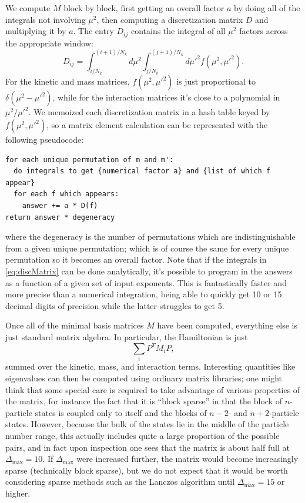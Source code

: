\begin{subappendices}
We compute $M$ block by block, first getting an overall factor $a$ by doing all 
of the integrals not involving $\mu^2$, then computing a discretization matrix 
$D$ and multiplying it by $a$. The entry $D_{ij}$ contains the integral of all
$\mu^2$ factors across the appropriate window:
\begin{equation}
    D_{ij} = \int_{i/N_k}^{(i+1)/N_k} d\mu^2 \int_{j/N_k}^{(j+1)/N_k} d\mu'^2
             f(\mu^2, \mu'^2).
    \label{eq:discMatrix}
\end{equation}
For the kinetic and mass matrices, $f(\mu^2, \mu'^2)$ is just proportional to
$\delta(\mu^2 - \mu'^2)$, while for the interaction matrices it's close to a 
polynomial in $\mu^2/\mu'^2$. We memoized each discretization matrix in a hash
table keyed by $f(\mu^2, \mu'^2)$, so a matrix element calculation can be 
represented with the following pseudocode:
\begin{verbatim}
for each unique permutation of m and m':
  do integrals to get {numerical factor a} and {list of which f appear}
  for each f which appears:
    answer += a * D(f)
return answer * degeneracy
\end{verbatim}
where the degeneracy is the number of permutations which are indistinguishable
from a given unique permutation; which is of course the same for every unique 
permutation so it becomes an overall factor. Note that if the integrals in 
\eqref{eq:discMatrix} can be done analytically, it's possible to program in the
answers as a function of a given set of input exponents. This is fantastically
faster and more precise than a numerical integration, being able to quickly get
10 or 15 decimal digits of precision while the latter struggles to get 5.

Once all of the minimal basis matrices $M$ have been computed, everything else
is just standard matrix algebra. In particular, the Hamiltonian is just
\begin{equation}
    \sum_i P^T M_i P,
\end{equation}
summed over the kinetic, mass, and interaction terms. Interesting quantities
like eigenvalues can then be computed using ordinary matrix libraries; one might
think that some special care is required to take advantage of various properties
of the matrix, for instance the fact that it is ``block sparse'' in that the
block of $n$-particle states is coupled only to itself and the blocks of $n-2$-
and $n+2$-particle states. However, because the bulk of the states lie in the
middle of the particle number range, this actually includes quite a large 
proportion of the possible pairs, and in fact upon inspection one sees that the
matrix is about half full at $\Delta_\mathrm{max} = 10$. If 
$\Delta_\mathrm{max}$ were increased further, the matrix would become 
increasingly sparse (technically block sparse), but we do not expect that it 
would be worth considering sparse methods such as the Lanczos algorithm until 
$\Delta_\mathrm{max} = 15$ or higher.


\end{subappendices}
